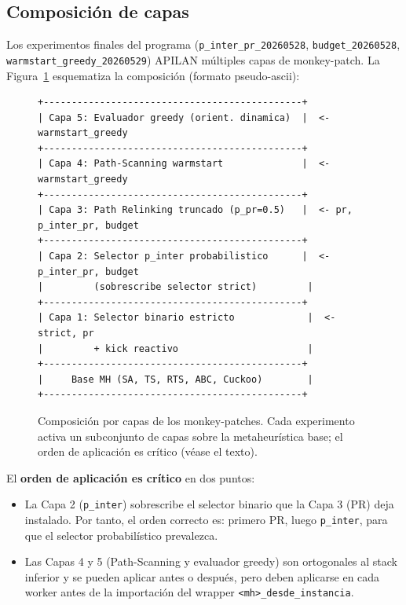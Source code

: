 \subsection{Composición de capas}

Los experimentos finales del programa (\texttt{p\_inter\_pr\_20260528},
\texttt{budget\_20260528}, \texttt{warmstart\_greedy\_20260529}) APILAN
múltiples capas de monkey-patch. La Figura~\ref{fig:capas} esquematiza
la composición (formato pseudo-ascii):

\begin{figure}[h]
\centering
\begin{verbatim}
+----------------------------------------------+
| Capa 5: Evaluador greedy (orient. dinamica)  |  <- warmstart_greedy
+----------------------------------------------+
| Capa 4: Path-Scanning warmstart              |  <- warmstart_greedy
+----------------------------------------------+
| Capa 3: Path Relinking truncado (p_pr=0.5)   |  <- pr, p_inter_pr, budget
+----------------------------------------------+
| Capa 2: Selector p_inter probabilistico      |  <- p_inter_pr, budget
|         (sobrescribe selector strict)         |
+----------------------------------------------+
| Capa 1: Selector binario estricto             |  <- strict, pr
|         + kick reactivo                       |
+----------------------------------------------+
|     Base MH (SA, TS, RTS, ABC, Cuckoo)        |
+----------------------------------------------+
\end{verbatim}
\caption{Composición por capas de los monkey-patches. Cada experimento
         activa un subconjunto de capas sobre la metaheurística base; el
         orden de aplicación es crítico (véase el texto).}
\label{fig:capas}
\end{figure}

El \textbf{orden de aplicación es crítico} en dos puntos:

\begin{itemize}
\item La Capa 2 (\texttt{p\_inter}) sobrescribe el selector binario
  que la Capa 3 (PR) deja instalado. Por tanto, el orden correcto es:
  primero PR, luego \texttt{p\_inter}, para que el selector
  probabilístico prevalezca.
\item Las Capas 4 y 5 (Path-Scanning y evaluador greedy) son
  ortogonales al stack inferior y se pueden aplicar antes o después,
  pero deben aplicarse en cada worker antes de la importación del
  wrapper \texttt{<mh>\_desde\_instancia}.
\end{itemize}


